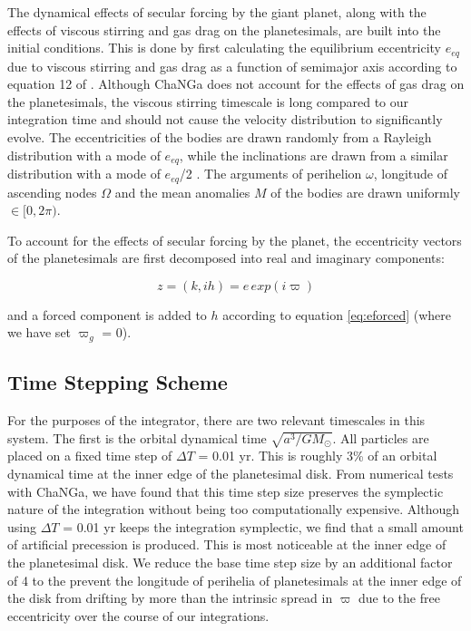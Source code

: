 \documentclass[twocolumn]{aastex63}
\begin{document}
The dynamical effects of secular forcing by the giant planet, along with  the effects of viscous stirring and gas drag on the planetesimals, are 
built into the initial conditions. This is done by first calculating the equilibrium eccentricity $e_{eq}$ due to viscous stirring and gas drag as a 
function of semimajor axis according to equation 12 of \citet{2002ApJ...581..666K}. Although {\sc ChaNGa} does not account for the effects of 
gas drag on the planetesimals, the viscous stirring timescale is long compared to our integration time and should not cause the velocity 
distribution to significantly evolve. The eccentricities of the bodies are drawn randomly from a Rayleigh distribution with a mode of $e_{eq}$, 
while the inclinations are drawn from a similar distribution with a mode of $e_{eq}$/2 \citep{1993MNRAS.263..875I}. The arguments of perihelion 
$\omega$, longitude of ascending nodes $\Omega$ and the mean anomalies $M$ of the bodies are drawn uniformly $\in [0, 2 \pi)$.

To account for the effects of secular forcing by the planet, the eccentricity vectors of the planetesimals are first decomposed into real and imaginary 
components:

\begin{equation}\label{eq:kh}
	z = (k, ih) = e \, exp(i \varpi)
\end{equation}

\noindent and a forced component is added to $h$ according to equation \ref{eq:eforced} (where we have set $\varpi_{g}$ = 0).

\subsection{Time Stepping Scheme}\label{sec:timestep}

For the purposes of the integrator, there are two relevant timescales in this system. The first is the orbital dynamical time $\sqrt{a^3/
G M_{\odot}}$. All particles are placed on a fixed time step of $\Delta T$ = 0.01 yr. This is roughly 3\% of an orbital dynamical time at 
the inner edge of the planetesimal disk. From numerical tests with {\sc ChaNGa}, we have found that this time step size preserves 
the symplectic nature of the integration without being too computationally expensive. Although using $\Delta T$ = 0.01 yr keeps the 
integration symplectic, we find that a small amount of artificial precession is produced. This is most noticeable at the inner edge of the
planetesimal disk. We reduce the base time step size by an additional factor of 4 to the prevent the longitude of perihelia of planetesimals at the inner edge of the disk from drifting by more than the intrinsic spread in $\varpi$ due to the free eccentricity over the course of our integrations.
\end{document}
